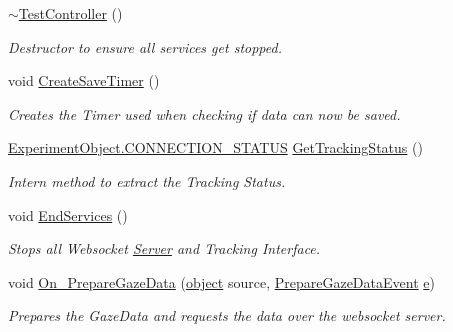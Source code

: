 \begin{DoxyCompactItemize}
\item 
\hyperlink{class_web_analyzer_1_1_controller_1_1_test_controller_a9404350d73eb0d40751b1bdee5171b71}{$\sim$\+Test\+Controller} ()
\begin{DoxyCompactList}\small\item\em Destructor to ensure all services get stopped. \end{DoxyCompactList}\item 
void \hyperlink{class_web_analyzer_1_1_controller_1_1_test_controller_a448797a07babe883ab8d8e646272a6eb}{Create\+Save\+Timer} ()
\begin{DoxyCompactList}\small\item\em Creates the Timer used when checking if data can now be saved. \end{DoxyCompactList}\item 
\hyperlink{class_web_analyzer_1_1_u_i_1_1_interaction_objects_1_1_experiment_object_a2875208b4f4b0ed643593152f4ec025c}{Experiment\+Object.\+C\+O\+N\+N\+E\+C\+T\+I\+O\+N\+\_\+\+S\+T\+A\+T\+U\+S} \hyperlink{class_web_analyzer_1_1_controller_1_1_test_controller_aef58517bbc760e87c541cc4b0272957c}{Get\+Tracking\+Status} ()
\begin{DoxyCompactList}\small\item\em Intern method to extract the Tracking Status. \end{DoxyCompactList}\item 
void \hyperlink{class_web_analyzer_1_1_controller_1_1_test_controller_af7260e39f8963732f38631dd618da497}{End\+Services} ()
\begin{DoxyCompactList}\small\item\em Stops all Websocket \hyperlink{namespace_web_analyzer_1_1_server}{Server} and Tracking Interface. \end{DoxyCompactList}\item 
void \hyperlink{class_web_analyzer_1_1_controller_1_1_test_controller_a61584d87704fffabf4ff0f8c04b33407}{On\+\_\+\+Prepare\+Gaze\+Data} (\hyperlink{_u_i_2_h_t_m_l_resources_2js_2lib_2underscore_8min_8js_aae18b7515bb2bc4137586506e7c0c903}{object} source, \hyperlink{class_web_analyzer_1_1_events_1_1_prepare_gaze_data_event}{Prepare\+Gaze\+Data\+Event} \hyperlink{_u_i_2_h_t_m_l_resources_2js_2lib_2bootstrap_8min_8js_ab5902775854a8b8440bcd25e0fe1c120}{e})
\begin{DoxyCompactList}\small\item\em Prepares the Gaze\+Data and requests the data over the websocket server. \end{DoxyCompactList}\end{DoxyCompactItemize}
